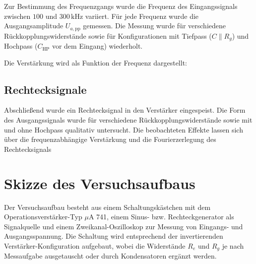 Zur Bestimmung des Frequenzgangs wurde die Frequenz des Eingangssignals zwischen $100$ und $300\,\mathrm{kHz}$ variiert. Für jede Frequenz wurde die Ausgangsamplitude $U_{a,\mathrm{pp}}$ gemessen. Die Messung wurde für verschiedene Rückkopplungswiderstände sowie für Konfigurationen mit Tiefpass ($C \parallel R_g$) und Hochpass ($C_\text{HP}$ vor dem Eingang) wiederholt.

Die Verstärkung wird als Funktion der Frequenz dargestellt:

\subsection*{Rechtecksignale}

Abschließend wurde ein Rechtecksignal in den Verstärker eingespeist. Die Form des Ausgangssignals wurde für verschiedene Rückkopplungswiderstände sowie mit und ohne Hochpass qualitativ untersucht. Die beobachteten Effekte lassen sich über die frequenzabhängige Verstärkung und die Fourierzerlegung des Rechtecksignals 

\section{Skizze des Versuchsaufbaus}
\label{sec:Skizze}

Der Versuchsaufbau besteht aus einem Schaltungskästchen mit dem Operationsverstärker-Typ $\mu$A 741, einem Sinus- bzw. Rechteckgenerator als Signalquelle und einem Zweikanal-Oszilloskop zur Messung von Eingangs- und Ausgangsspannung. Die Schaltung wird entsprechend der invertierenden Verstärker-Konfiguration aufgebaut, wobei die Widerstände $R_e$ und $R_g$ je nach Messaufgabe ausgetauscht oder durch Kondensatoren ergänzt werden.

